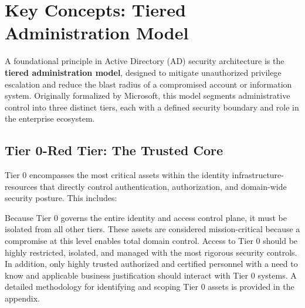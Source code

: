 \section{Key Concepts: Tiered Administration Model}
A foundational principle in Active Directory (AD) security architecture is the \textbf{tiered administration model}, designed to mitigate unauthorized privilege escalation and reduce the blast radius of a compromised account or information system. Originally formalized by Microsoft, this model segments administrative control into three distinct tiers, each with a defined security boundary and role in the enterprise ecosystem.

\subsection{Tier 0-Red Tier: The Trusted Core}
Tier 0 encompasses the most critical assets within the identity infrastructure-resources that directly control authentication, authorization, and domain-wide security posture. This includes:


Because Tier 0 governs the entire identity and access control plane, it must be isolated from all other tiers. These assets are considered mission-critical because a compromise at this level enables total domain control. Access to Tier 0 should be highly restricted, isolated, and managed with the most rigorous security controls. In addition, only highly trusted authorized and certified personnel with a need to know and applicable business justification should interact with Tier 0 systems. A detailed methodology for identifying and scoping Tier 0 assets is provided in the appendix.

